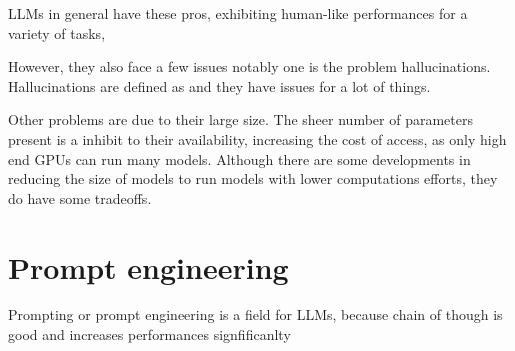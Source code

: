 LLMs in general have these pros, exhibiting human-like performances for a variety of tasks, 

However, they also face a few issues notably one is the problem hallucinations. Hallucinations are defined as  and they have issues for a lot of things.

Other problems are due to their large size. The sheer number of parameters present is a inhibit to their availability, increasing the cost of access, as only high end GPUs can run many models. Although there are some developments in reducing the size of models to run models with lower computations efforts, they do have some tradeoffs. 

\section{Prompt engineering}
Prompting or prompt engineering is a field for LLMs, because chain of though is good and increases performances signfificanlty
